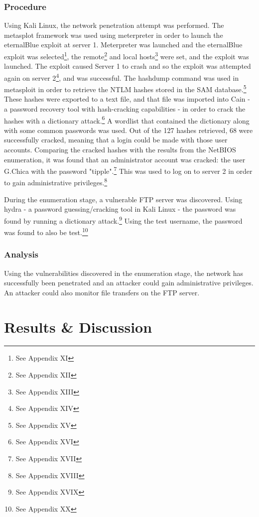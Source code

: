 \documentclass[12pt,a4paper]{article}
\begin{document}
				\subsubsection{Procedure}
					Using Kali Linux, the network penetration attempt was performed. The metasplot framework was used using meterpreter in order to launch the eternalBlue exploit at server 1. Meterpreter was launched and the eternalBlue exploit was selected\footnote{See Appendix XI}, the remote\footnote{See Appendix XII} and local hosts\footnote{See Appendix XIII} were set, and the exploit was launched. The exploit caused Server 1 to crash and so the exploit was attempted again on server 2\footnote{See Appendix XIV}, and was successful. The hashdump command was used in metasploit in order to retrieve the \acrshort{NTLM} hashes stored in the \acrshort{SAM} database.\footnote{See Appendix XV} These hashes were exported to a text file, and that file was imported into Cain - a password recovery tool with hash-cracking capabilities -  in order to crack the hashes with a dictionary attack.\footnote{See Appendix XVI} A wordlist that contained the dictionary along with some common passwords was used. Out of the 127 hashes retrieved, 68 were successfully cracked, meaning that a login could be made with those user accounts. Comparing the cracked hashes with the results from the \acrshort{NetBIOS} enumeration, it was found that an administrator account was cracked: the user G.Chica with the password "tipple".\footnote{See Appendix XVII} This was used to log on to server 2 in order to gain administrative privileges.\footnote{See Appendix XVIII}

					During the enumeration stage, a vulnerable \acrshort{FTP} server was discovered. Using hydra - a password guessing/cracking tool in Kali Linux - the password was found by running a dictionary attack.\footnote{See Appendix XVIX} Using the test username, the password was found to also be test.\footnote{See Appendix XX}
				\subsubsection{Analysis}
					Using the vulnerabilities discovered in the enumeration stage, the network has successfully been penetrated and an attacker could gain administrative privileges. An attacker could also monitor file transfers on the \acrshort{FTP} server.

	\clearpage
	\section{Results \& Discussion}
\end{document}

